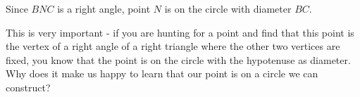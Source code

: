 









Since $BNC$ is a right angle, point $N$ is on the circle with diameter $BC.$

This is very important - if you are hunting for a point and find that this point is the vertex of a right angle of a right triangle where the other two vertices are fixed, you know that the point is on the circle with the hypotenuse as diameter. Why does it make us happy to learn that our point is on a circle we can construct?





